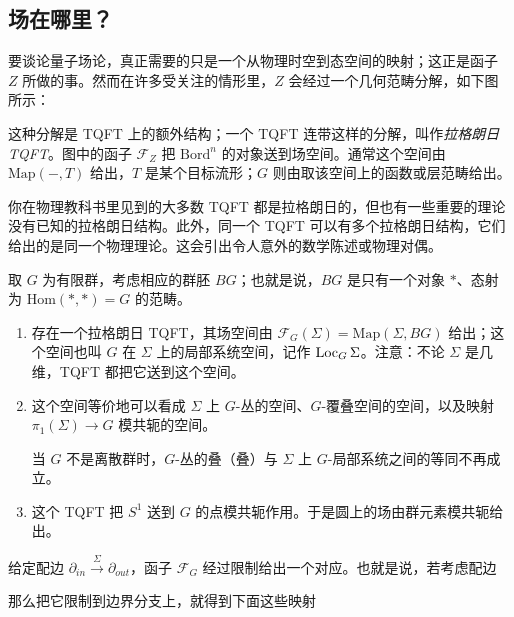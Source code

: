 \subsection{场在哪里？}

要谈论量子场论，真正需要的只是一个从物理时空到态空间的映射；这正是函子 $Z$ 所做的事。然而在许多受关注的情形里，$Z$ 会经过一个几何范畴分解，如下图所示：


这种分解是 TQFT 上的额外结构；一个 TQFT 连带这样的分解，叫作\emph{拉格朗日 TQFT}。图中的函子 $\mathcal F_Z$ 把 $\mathrm{Bord}^n$ 的对象送到场空间。通常这个空间由 $\mathrm{Map}(-,T)$ 给出，$T$ 是某个目标流形；$G$ 则由取该空间上的函数或层范畴给出。

\begin{rem}
你在物理教科书里见到的大多数 TQFT 都是拉格朗日的，但也有一些重要的理论没有已知的拉格朗日结构。此外，同一个 TQFT 可以有多个拉格朗日结构，它们给出的是同一个物理理论。这会引出令人意外的数学陈述或物理对偶。
\end{rem}

\begin{exmp}
取 $G$ 为有限群，考虑相应的群胚 $BG$；也就是说，$BG$ 是只有一个对象 $*$、态射为 $\mathrm{Hom}(*,*)=G$ 的范畴。

\begin{enumerate}[label=(\roman*),leftmargin=2.2em]
\item 存在一个拉格朗日 TQFT，其场空间由 $\mathcal F_G(\Sigma)=\mathrm{Map}(\Sigma,BG)$ 给出；这个空间也叫 $G$ 在 $\Sigma$ 上的局部系统空间，记作 $\operatorname{Loc}_G\Sigma$。注意：不论 $\Sigma$ 是几维，TQFT 都把它送到这个空间。
\item 这个空间等价地可以看成 $\Sigma$ 上 $G$-丛的空间、$G$-覆叠空间的空间，以及映射 $\pi_1(\Sigma)\to G$ 模共轭的空间。
\begin{rem}
当 $G$ 不是离散群时，$G$-丛的叠（叠）与 $\Sigma$ 上 $G$-局部系统之间的等同不再成立。
\end{rem}
\item 这个 TQFT 把 $S^1$ 送到 $G$ 的点模共轭作用。于是圆上的场由群元素模共轭给出。
\end{enumerate}
\end{exmp}

给定配边 $\partial_{in}\xrightarrow{\ \Sigma\ }\partial_{out}$，函子 $\mathcal F_G$ 经过限制给出一个对应。也就是说，若考虑配边


那么把它限制到边界分支上，就得到下面这些映射

